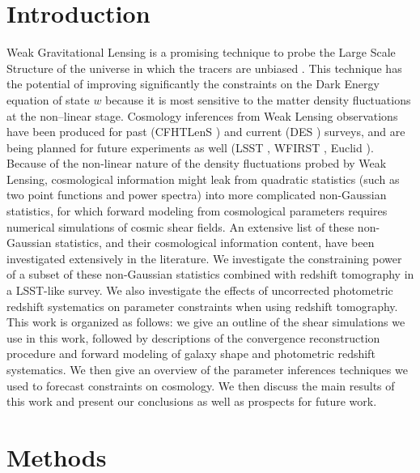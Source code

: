 \documentclass[reprint,aps,prd,superscriptaddress,showkeys,showpacs]{revtex4-1}
\begin{document}
\section{Introduction}
%
Weak Gravitational Lensing is a promising technique to probe the Large Scale Structure of the universe in which the tracers are unbiased \citep{wlreview}. This technique has the potential of improving significantly the constraints on the Dark Energy equation of state $w$ because it is most sensitive to the matter density fluctuations at the non--linear stage. Cosmology inferences from Weak Lensing observations have been produced for past (CFHTLenS \citep{cfht1}) and current (DES \citep{DES}) surveys, and are being planned for future experiments as well (LSST \citep{LSST}, WFIRST \citep{WFIRST}, Euclid \citep{Euclid}). Because of the non-linear nature of the density fluctuations probed by Weak Lensing, cosmological information might leak from quadratic statistics (such as two point functions and power spectra) into more complicated non-Gaussian statistics, for which forward modeling from cosmological parameters requires numerical simulations of cosmic shear fields. An extensive list of these non-Gaussian statistics, and their cosmological information content, have been investigated extensively in the literature. We investigate the constraining power of a subset of these non-Gaussian statistics combined with redshift tomography in a LSST-like survey. We also investigate the effects of uncorrected photometric redshift systematics on parameter constraints when using redshift tomography. This work is organized as follows: we give an outline of the shear simulations we use in this work, followed by descriptions of the convergence reconstruction procedure and forward modeling of galaxy shape and photometric redshift systematics. We then give an overview of the parameter inferences techniques we used to forecast constraints on cosmology. We then discuss the main results of this work and present our conclusions as well as prospects for future work.  


\section{Methods}

\end{document}
